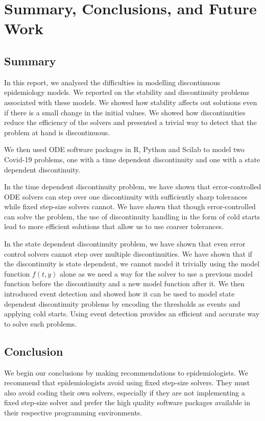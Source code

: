 
\section{Summary, Conclusions, and Future Work}
\label{section:summary}
\subsection{Summary}
In this report, we analysed the difficulties in modelling discontinuous epidemiology models. We reported on the stability and discontinuity problems associated with these models. We showed how stability affects out solutions even if there is a small change in the initial values. We showed how discontinuities reduce the efficiency of the solvers and presented a trivial way to detect that the problem at hand is discontinuous.

We then used ODE software packages in R, Python and Scilab to model two Covid-19 problems, one with a time dependent discontinuity and one with a state dependent discontinuity.

In the time dependent discontinuity problem, we have shown that error-controlled ODE solvers can step over one discontinuity with sufficiently sharp tolerances while fixed step-size solvers cannot. We have shown that though error-controlled can solve the problem, the use of discontinuity handling in the form of cold starts lead to more efficient solutions that allow us to use coarser tolerances. 

In the state dependent discontinuity problem, we have shown that even error control solvers cannot step over multiple discontinuities. We have shown that if the discontinuity is state dependent, we cannot model it trivially using the model function $f(t, y)$ alone as we need a way for the solver to use a previous model function before the discontinuity and a new model function after it. We then introduced event detection and showed how it can be used to model state dependent discontinuity problems by encoding the thresholds as events and applying cold starts. Using event detection provides an efficient and accurate way to solve such problems.

\subsection{Conclusion}
\label{subsection:conclusion}
We begin our conclusions by making recommendations to epidemiologists. 
We recommend that epidemiologists avoid using fixed step-size solvers. They must also avoid coding their own solvers, especially if they are not implementing a fixed step-size solver and prefer the high quality software packages available in their respective programming environments.

